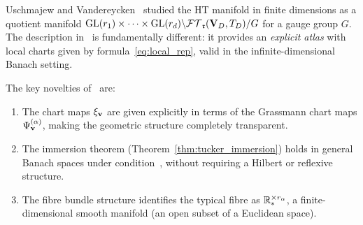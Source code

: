Uschmajew and Vandereycken~\cite{UschmajewVandereycken2013} studied the HT
manifold in finite dimensions as a quotient manifold
$\mathrm{GL}(r_1) \times \cdots \times \mathrm{GL}(r_d) \backslash \mathcal{FT}_{\mathfrak{r}}(\mathbf{V}_D,T_D) / G$
for a gauge group $G$. The description in~\cite{FHN2019} is
fundamentally different: it provides an \emph{explicit atlas}
with local charts given by formula~\eqref{eq:local_rep}, valid
in the infinite-dimensional Banach setting.

The key novelties of~\cite{FHN2019} are:
\begin{enumerate}
\item The chart maps $\xi_{\mathbf{v}}$ are given explicitly in terms
    of the Grassmann chart maps $\Psi^{(\alpha)}_{\mathbf{v}}$, making the
    geometric structure completely transparent.
\item The immersion theorem (Theorem~\ref{thm:tucker_immersion})
    holds in general Banach spaces under condition~\condINJ, without
    requiring a Hilbert or reflexive structure.
\item The fibre bundle structure identifies the typical fibre
    as $\mathbb{R}^{\times r_\alpha}_*$, a finite-dimensional
    smooth manifold (an open subset of a Euclidean space).
\end{enumerate}

